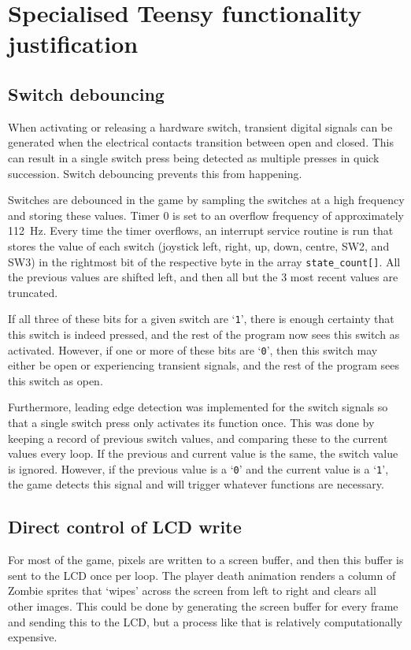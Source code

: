 \documentclass[10pt, titlepage]{article}
\begin{document}
\clearpage
\section{Specialised Teensy functionality justification}

\subsection{Switch debouncing}
When activating or releasing a hardware switch, transient digital signals can be generated when the electrical contacts transition between open and closed. This can result in a single switch press being detected as multiple presses in quick succession. Switch debouncing prevents this from happening.

Switches are debounced in the game by sampling the switches at a high frequency and storing these values. Timer 0 is set to an overflow frequency of approximately \SI{112}{\Hz}. Every time the timer overflows, an interrupt service routine is run that stores the value of each switch (joystick left, right, up, down, centre, SW2, and SW3) in the rightmost bit of the respective byte in the array \texttt{state\_count[]}. All the previous values are shifted left, and then all but the 3 most recent values are truncated.

If all three of these bits for a given switch are `\texttt{1}', there is enough certainty that this switch is indeed pressed, and the rest of the program now sees this switch as activated. However, if one or more of these bits are `\texttt{0}', then this switch may either be open or experiencing transient signals, and the rest of the program sees this switch as open.

Furthermore, leading edge detection was implemented for the switch signals so that a single switch press only activates its function once. This was done by keeping a record of previous switch values, and comparing these to the current values every loop. If the previous and current value is the same, the switch value is ignored. However, if the previous value is a `\texttt{0}' and the current value is a `\texttt{1}', the game detects this signal and will trigger whatever functions are necessary.

\subsection{Direct control of LCD write}
For most of the game, pixels are written to a screen buffer, and then this buffer is sent to the LCD once per loop. The player death animation renders a column of Zombie sprites that `wipes' across the screen from left to right and clears all other images. This could be done by generating the screen buffer for every frame and sending this to the LCD, but a process like that is relatively computationally expensive.
\end{document}
